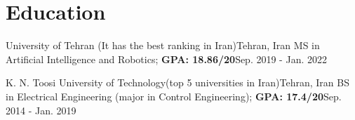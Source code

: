 
\section{Education}
  \vspace{3pt}
  \resumeSubHeadingListStart
    
    
      \resumeSubheading
      {University of Tehran (It has the best ranking in Iran)}{Tehran, Iran}
      {MS in Artificial Intelligence and Robotics; \textbf{GPA: 18.86/20}}{Sep. 2019 - Jan. 2022}

      \resumeSubheading
      {K. N. Toosi University of Technology(top 5 universities in Iran)}{Tehran, Iran}
      {BS in Electrical Engineering (major in Control Engineering); \textbf{GPA: 17.4/20}}{Sep. 2014 - Jan. 2019}
    
  \resumeSubHeadingListEnd